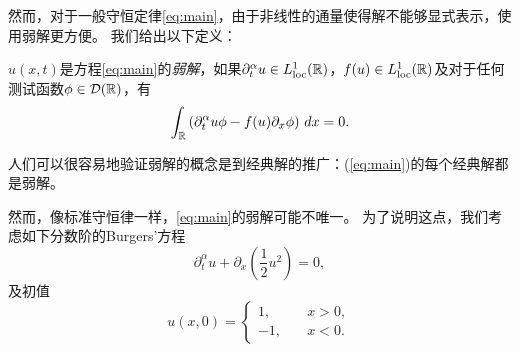 然而，对于一般守恒定律\eqref{eq:main}，由于非线性的通量使得解不能够显式表示，使用弱解更方便。 我们给出以下定义：
\begin{defn}\label{def_ws}
	$u(x,t)$是方程\eqref{eq:main}的{\it 弱解}，如果$\partial_t^\alpha u\in L^1_{\mathrm{loc}}({\mathbb{R}})$，$f(u)\in L^1_{\mathrm{loc}}({\mathbb{R}})$及对于任何测试函数$\phi \in \mathcal{D}({\mathbb{R}})$，有
	\begin{equation}
	\int_{\mathbb{R}} \left(\partial_t^\alpha u \phi - f(u)\partial_x\phi\right)\,dx = 0.
	\end{equation}
\end{defn}
人们可以很容易地验证弱解的概念是到经典解的推广：(\ref{eq:main})的每个经典解都是弱解。

然而，像标准守恒律一样，\eqref{eq:main}的弱解可能不唯一。 为了说明这点，我们考虑如下分数阶的Burgers'方程
\begin{equation}\label{burgers}
	\partial_t^\alpha u + \partial_x\left(\frac{1}{2}u^2\right) = 0,
\end{equation}
及初值
\begin{equation}
	u(x,0) = \begin{cases}
		1, \quad & x > 0, \\
		-1, \quad & x < 0.
	\end{cases}
\end{equation}

